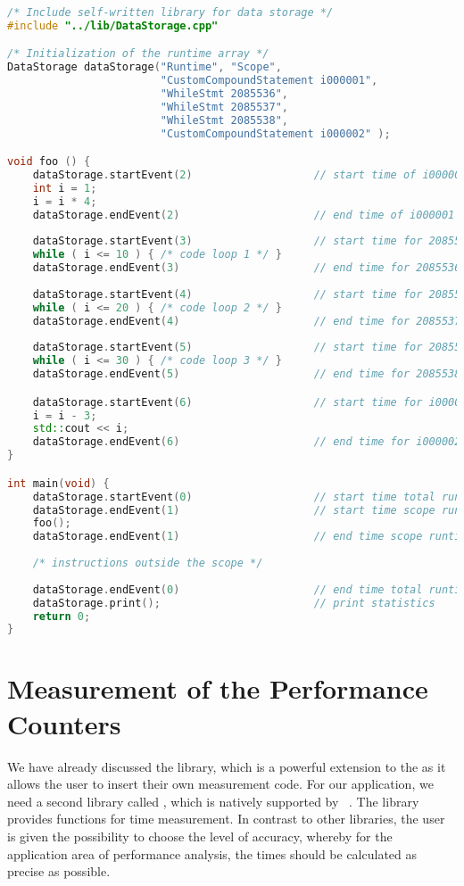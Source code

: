 \begin{lstlisting}[float, language=C++, caption=Example Code for Inserting Callback Functions., label=lst:b:transformed_file]
/* Include self-written library for data storage */
#include "../lib/DataStorage.cpp"

/* Initialization of the runtime array */
DataStorage dataStorage("Runtime", "Scope", 
                        "CustomCompoundStatement i000001", 
                        "WhileStmt 2085536", 
                        "WhileStmt 2085537", 
                        "WhileStmt 2085538", 
                        "CustomCompoundStatement i000002" );

void foo () {
    dataStorage.startEvent(2)                   // start time of i000001
    int i = 1;
    i = i * 4;
    dataStorage.endEvent(2)                     // end time of i000001     
    
    dataStorage.startEvent(3)                   // start time for 2085536
    while ( i <= 10 ) { /* code loop 1 */ }
    dataStorage.endEvent(3)                     // end time for 2085536
    
    dataStorage.startEvent(4)                   // start time for 2085537
    while ( i <= 20 ) { /* code loop 2 */ }
    dataStorage.endEvent(4)                     // end time for 2085537
    
    dataStorage.startEvent(5)                   // start time for 2085538
    while ( i <= 30 ) { /* code loop 3 */ }
    dataStorage.endEvent(5)                     // end time for 2085538

    dataStorage.startEvent(6)                   // start time for i000002
    i = i - 3;
    std::cout << i;
    dataStorage.endEvent(6)                     // end time for i000002
}

int main(void) {
    dataStorage.startEvent(0)                   // start time total runtime
    dataStorage.endEvent(1)                     // start time scope runtime
    foo();
    dataStorage.endEvent(1)                     // end time scope runtime
    
    /* instructions outside the scope */
    
    dataStorage.endEvent(0)                     // end time total runtime
    dataStorage.print();                        // print statistics
    return 0;
}
\end{lstlisting} 

\section{Measurement of the Performance Counters}
We have already discussed the \DATA library, which is a powerful extension to the \TOOL as it allows the user to insert their own measurement code. For our application, we need a second library called \CHRONO, which is natively supported by \CPP~\cite{ChronoLibrary}. The library provides functions for time measurement. In contrast to other libraries, the user is given the possibility to choose the level of accuracy, whereby for the application area of performance analysis, the times should be calculated as precise as possible. 

